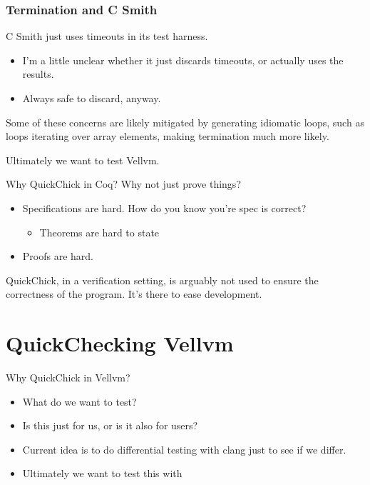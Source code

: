 \documentclass{beamer}
\begin{document}
\begin{frame}
  \frametitle{Termination and C Smith}

  C Smith just uses timeouts in its test harness.

  \begin{itemize}
  \item I'm a little unclear whether it just discards timeouts, or
    actually uses the results.
  \item Always safe to discard, anyway.
  \end{itemize}

  Some of these concerns are likely mitigated by generating idiomatic
  loops, such as loops iterating over array elements, making
  termination much more likely.
\end{frame}
\begin{frame}
  Ultimately we want to test Vellvm.
\end{frame}

\begin{frame}
  Why QuickChick in Coq? Why not just prove things?

  \begin{itemize}
  \item Specifications are hard. How do you know you're spec is
    correct?
    \begin{itemize}
    \item Theorems are hard to state
    \end{itemize}
  \item Proofs are hard.
  \end{itemize}

  QuickChick, in a verification setting, is arguably not used to
  ensure the correctness of the program. It's there to ease
  development.
\end{frame}

\section{QuickChecking Vellvm}

\begin{frame}
  Why QuickChick in Vellvm?

  \begin{itemize}
  \item What do we want to test?
  \item Is this just for us, or is it also for users?
  \item Current idea is to do differential testing with clang just to
    see if we differ.
  \item Ultimately we want to test this with 
  \end{itemize}
\end{frame}
\end{document}
